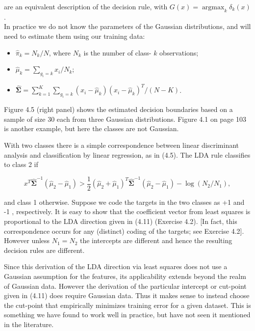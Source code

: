 \documentclass[10pt]{article}
\begin{document}
are an equivalent description of the decision rule, with $G(x)=\operatorname{argmax}_{k} \delta_{k}(x)$.\\
In practice we do not know the parameters of the Gaussian distributions, and will need to estimate them using our training data:

\begin{itemize}
  \item $\hat{\pi}_{k}=N_{k} / N$, where $N_{k}$ is the number of class- $k$ observations;
  \item $\hat{\mu}_{k}=\sum_{g_{i}=k} x_{i} / N_{k}$;
  \item $\hat{\boldsymbol{\Sigma}}=\sum_{k=1}^{K} \sum_{g_{i}=k}\left(x_{i}-\hat{\mu}_{k}\right)\left(x_{i}-\hat{\mu}_{k}\right)^{T} /(N-K)$.
\end{itemize}

Figure 4.5 (right panel) shows the estimated decision boundaries based on a sample of size 30 each from three Gaussian distributions. Figure 4.1 on page 103 is another example, but here the classes are not Gaussian.

With two classes there is a simple correspondence between linear discriminant analysis and classification by linear regression, as in (4.5). The LDA rule classifies to class 2 if


\begin{equation*}
x^{T} \hat{\boldsymbol{\Sigma}}^{-1}\left(\hat{\mu}_{2}-\hat{\mu}_{1}\right)>\frac{1}{2}\left(\hat{\mu}_{2}+\hat{\mu}_{1}\right)^{T} \hat{\boldsymbol{\Sigma}}^{-1}\left(\hat{\mu}_{2}-\hat{\mu}_{1}\right)-\log \left(N_{2} / N_{1}\right), \tag{4.11}
\end{equation*}


and class 1 otherwise. Suppose we code the targets in the two classes as +1 and -1 , respectively. It is easy to show that the coefficient vector from least squares is proportional to the LDA direction given in (4.11) (Exercise 4.2). [In fact, this correspondence occurs for any (distinct) coding of the targets; see Exercise 4.2]. However unless $N_{1}=N_{2}$ the intercepts are different and hence the resulting decision rules are different.

Since this derivation of the LDA direction via least squares does not use a Gaussian assumption for the features, its applicability extends beyond the realm of Gaussian data. However the derivation of the particular intercept or cut-point given in (4.11) does require Gaussian data. Thus it makes sense to instead choose the cut-point that empirically minimizes training error for a given dataset. This is something we have found to work well in practice, but have not seen it mentioned in the literature.
\end{document}
